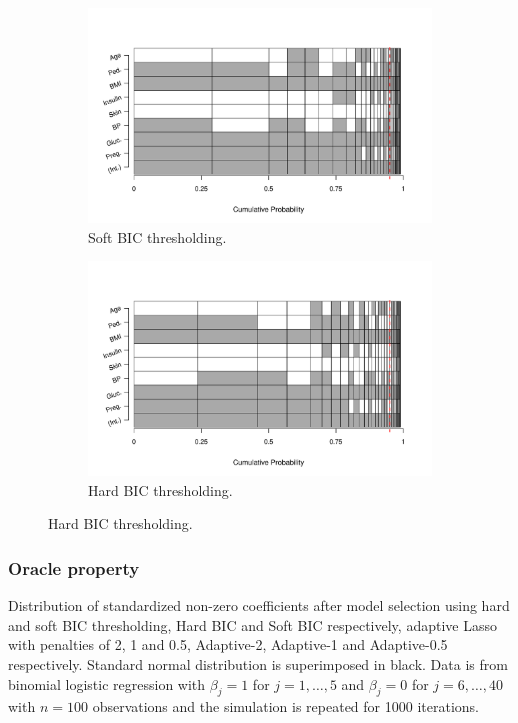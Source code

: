 \documentclass{beamer}
\begin{document}
\begin{frame}
\begin{figure}[t]
  \begin{subfigure}{.5\textwidth}
    \centering
    \includegraphics[scale=0.25]{conf_set_elector=ms_thres_w_type=bic_g_type=enhanced2_fixed=FALSE.pdf}
    \caption{{\footnotesize Soft BIC thresholding.}}
    \label{fig:ms_thres_w_type=bic_g_type=enhanced2_fixed=FALSE}
  \end{subfigure}%
  \begin{subfigure}{.5\textwidth}
    \centering
    \includegraphics[scale=0.25]{conf_set_elector=ms_thres_w_type=bic_g_type=enhanced2_fixed=TRUE.pdf}
    \caption{{\footnotesize Hard BIC thresholding.}}
    \label{fig:ms_thres_w_type=bic_g_type=enhanced2_fixed=TRUE}
  \end{subfigure}
  \label{fig:combined}
\end{figure}
\end{frame}

\begin{frame}
  \frametitle{Oracle property}
  Distribution of standardized non-zero coefficients after model selection using hard and soft BIC thresholding, Hard BIC and Soft BIC respectively, adaptive Lasso with penalties of 2, 1 and 0.5, Adaptive-2, Adaptive-1 and Adaptive-0.5 respectively. Standard normal distribution is superimposed in black. Data is from binomial logistic regression with $\beta_j = 1$ for $j=1,\dots,5$ and $\beta_j=0$ for $j=6,\dots,40$ with $n=100$ observations and the simulation is repeated for 1000 iterations.
\end{frame}
\end{document}
